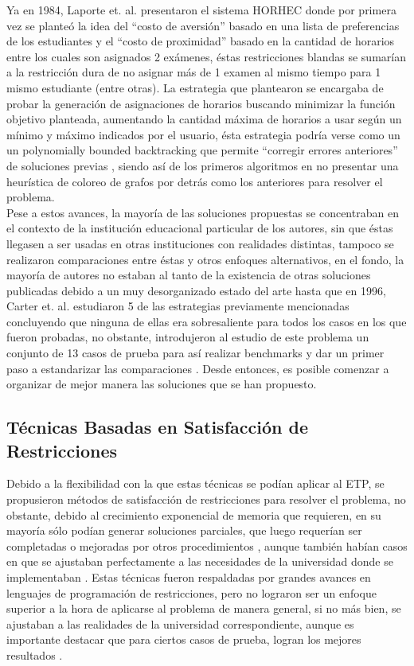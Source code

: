 \documentclass[letter, 10pt]{article}
\begin{document}
Ya en 1984, Laporte et. al. \cite{LAPORTE1984351} presentaron el sistema HORHEC donde por primera vez se planteó la idea del ``costo de aversión'' basado en una lista de preferencias de los estudiantes y el ``costo de proximidad'' basado en la cantidad de horarios entre los cuales son asignados 2 exámenes, éstas restricciones blandas se sumarían a la restricción dura de no asignar más de 1 examen al mismo tiempo para 1 mismo estudiante (entre otras). La estrategia que plantearon se encargaba de probar la generación de asignaciones de horarios buscando minimizar la función objetivo planteada, aumentando la cantidad máxima de horarios a usar según un mínimo y máximo indicados por el usuario, ésta estrategia podría verse como un un polynomially bounded backtracking que permite ``corregir errores anteriores'' de soluciones previas \cite{10.2307/170814}, siendo así de los primeros algoritmos en no presentar una heurística de coloreo de grafos por detrás como los anteriores para resolver el problema.\\

Pese a estos avances, la mayoría de las soluciones propuestas se concentraban en el contexto de la institución educacional particular de los autores, sin que éstas llegasen a ser usadas en otras instituciones con realidades distintas, tampoco se realizaron comparaciones entre éstas y otros enfoques alternativos, en el fondo, la mayoría de autores no estaban al tanto de la existencia de otras soluciones publicadas debido a un muy desorganizado estado del arte \cite{10.2307/170814} hasta que en 1996, Carter et. al. \cite{10.2307/3010580} estudiaron 5 de las estrategias previamente mencionadas concluyendo que ninguna de ellas era sobresaliente para todos los casos en los que fueron probadas, no obstante, introdujeron al estudio de este problema un conjunto de 13 casos de prueba para así realizar benchmarks y dar un primer paso a estandarizar las comparaciones \cite{Qu2009}. Desde entonces, es posible comenzar a organizar de mejor manera las soluciones que se han propuesto.

\subsection*{Técnicas Basadas en Satisfacción de Restricciones}

Debido a la flexibilidad con la que estas técnicas se podían aplicar al ETP, se propusieron métodos de satisfacción de restricciones para resolver el problema, no obstante, debido al crecimiento exponencial de memoria que requieren, en su mayoría sólo podían generar soluciones parciales, que luego requerían ser completadas o mejoradas por otros procedimientos \cite{10.1007/BFb0055888, 10.1007/978-3-540-45157-0_14, ahnkim}, aunque también habían casos en que se ajustaban perfectamente a las necesidades de la universidad donde se implementaban \cite{tacadaograce}. Estas técnicas fueron respaldadas por grandes avances en lenguajes de programación de restricciones, pero no lograron ser un enfoque superior a la hora de aplicarse al problema de manera general, si no más bien, se ajustaban a las realidades de la universidad correspondiente, aunque es importante destacar que para ciertos casos de prueba, logran los mejores resultados \cite{Qu2009}.
\end{document}
